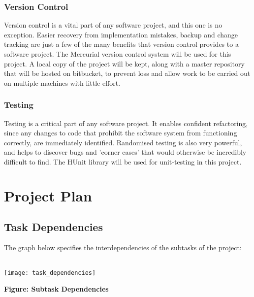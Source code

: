 \documentclass{article}
\begin{document}
\subsubsection{Version Control}
Version control is a vital part of any software project, and this one is no exception. Easier recovery from implementation mistakes, backup and change tracking are just a few of the many benefits that version control provides to a software project. The Mercurial version control system will be used for this project. A local copy of the project will be kept, along with a master repository that will be hosted on bitbucket, to prevent loss and allow work to be carried out on multiple machines with little effort. \\

\subsubsection{Testing}
Testing is a critical part of any software project. It enables confident refactoring, since any changes to code that prohibit the software system from functioning correctly, are immediately identified. Randomised testing is also very powerful, and helps to discover bugs and 'corner cases' that would otherwise be incredibly difficult to find. The HUnit library will be used for unit-testing in this project.

\pagebreak
\section{Project Plan}
\subsection{Task Dependencies}
The graph below specifies the interdependencies of the subtasks of the project:
\\\\
\centerline{\texttt{[image: task\_dependencies]}}
\centerline{\textbf{Figure: Subtask Dependencies}}
\end{document}
